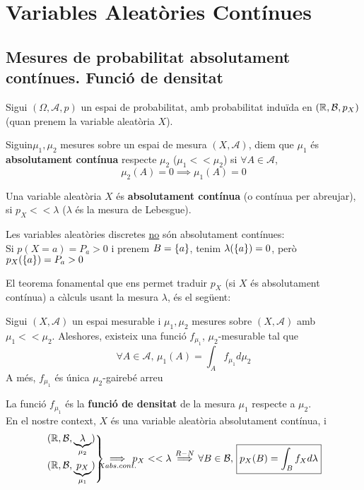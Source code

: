 \section{Variables Aleatòries Contínues}
\subsection{Mesures de probabilitat absolutament contínues. Funció de densitat}
Sigui $(\Omega, \mathcal{A},p)$ un espai de probabilitat, amb probabilitat induïda en $(\mathbb{R}, \mathcal{B},p_{X})$ (quan prenem la variable aleatòria $X$).

\begin{defi}
  Siguin$\mu_{1},\mu_{2}$ mesures sobre un espai de mesura $(X,\mathcal{A})$, diem que $\mu_{1}$ és \textbf{absolutament contínua} respecte $\mu_{2}$ ($\mu_{1}<<\mu_{2}$) si $\forall A\in \mathcal{A}$,
  \[
    \mu_{2}(A)=0 \implies \mu_{1}(A)=0
  \]
\end{defi}

\begin{defi}
  Una variable aleatòria $X$ és \textbf{absolutament contínua} (o contínua per abreujar), si $p_{X}<<\lambda$ ($\lambda$ és la mesura de Lebesgue).
\end{defi}

\begin{obs}
  Les variables aleatòries discretes \underline{no} són absolutament contínues: \\
  Si $p(X=a)=P_{a}>0$ i prenem $B=\left\{a\right\}$, tenim $\lambda(\left\{a\right\})=0$, però $p_{X}(\left\{a\right\})=P_{a}>0$
\end{obs}

El teorema fonamental que ens permet traduir $p_{X}$ (si $X$ és absolutament contínua) a càlculs usant la mesura $\lambda$, és el següent:

\begin{thm}
  Sigui $(X,\mathcal{A})$ un espai mesurable i $\mu_{1},\mu_{2}$ mesures sobre $(X,\mathcal{A})$ amb $\mu_{1}<<\mu_{2}$. Aleshores, existeix una funció $f_{\mu_{1}}$, $\mu_{2}$-mesurable tal que
  \[
    \forall A \in \mathcal{A}, \, \mu_{1}(A)=\int_{A}f_{\mu_{1}}d\mu_{2}
  \]
  A més, $f_{\mu_{1}}$ és única $\mu_{2}$-gairebé arreu
\end{thm}

\begin{defi}
  La funció $f_{\mu_{1}}$ és la \textbf{funció de densitat} de la mesura $\mu_{1}$ respecte a $\mu_{2}$. \\
  En el nostre context, $X$ és una variable aleatòria absolutament contínua, i
  \[
    \begin{rcases}
      (\real, \mathcal{B},\underbrace{\lambda}_{\mu_{2}})\\
      (\real, \mathcal{B}, \underbrace{p_{X}}_{\mu_{1}})
    \end{rcases}\underset{\mathclap{X abs. cont.}}{\implies} \, p_{X}<<\lambda\overset{R-N}{\implies} \forall B \in \mathcal{B}, \, \boxed{p_{X}(B)=\int_{B}f_{X}d\lambda}
  \]
\end{defi}

